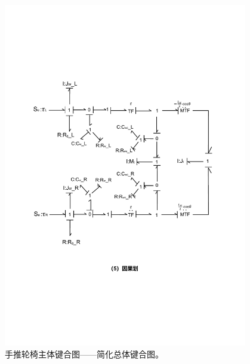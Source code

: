	\begin{figure}[!h]
		\centering
		\includegraphics[width=0.95\textwidth,angle=90]{fig/part1_bond.pdf}
		\caption{手推轮椅主体键合图——简化总体键合图。}\label{fig:part1_bond}
	\end{figure}

